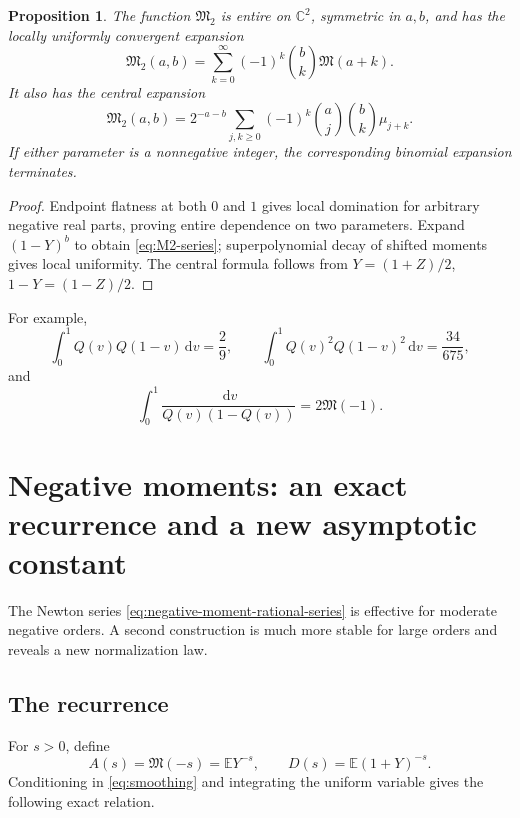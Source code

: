 \documentclass[11pt,oneside]{article}
\newtheorem{proposition}[theorem]{Proposition}
\theoremstyle{definition}
\newcommand{\Q}{Q}
\newcommand{\M}{\mathfrak M}
\newcommand{\E}{\mathbb E}
\newcommand{\C}{\mathbb C}
\newcommand{\dd}{\,\mathrm d}
\begin{document}
\begin{proposition}\label{prop:M2}
The function \(\M_2\) is entire on \(\C^2\), symmetric in \(a,b\), and has the
locally uniformly convergent expansion
\begin{equation}\label{eq:M2-series}
 \M_2(a,b)=\sum_{k=0}^{\infty}(-1)^k\binom bk\M(a+k).
\end{equation}
It also has the central expansion
\begin{equation}\label{eq:M2-central}
 \M_2(a,b)=2^{-a-b}
 \sum_{j,k\ge0}(-1)^k\binom aj\binom bk\mu_{j+k}.
\end{equation}
If either parameter is a nonnegative integer, the corresponding binomial expansion
terminates.
\end{proposition}

\begin{proof}
Endpoint flatness at both \(0\) and \(1\) gives local domination for arbitrary negative
real parts, proving entire dependence on two parameters.  Expand \((1-Y)^b\) to obtain
\cref{eq:M2-series}; superpolynomial decay of shifted moments gives local uniformity.
The central formula follows from \(Y=(1+Z)/2\), \(1-Y=(1-Z)/2\).
\end{proof}

For example,
\begin{equation}\label{eq:M2-examples}
 \int_0^1\Q(v)\Q(1-v)\dd v=\frac29,
 \qquad
 \int_0^1\Q(v)^2\Q(1-v)^2\dd v=\frac{34}{675},
\end{equation}
and
\begin{equation}\label{eq:M2-negative-example}
 \int_0^1\frac{\dd v}{\Q(v)(1-\Q(v))}=2\M(-1).
\end{equation}

\section{Negative moments: an exact recurrence and a new asymptotic constant}

The Newton series \cref{eq:negative-moment-rational-series} is effective for moderate
negative orders.  A second construction is much more stable for large orders and reveals
a new normalization law.

\subsection{The recurrence}

For \(s>0\), define
\begin{equation}\label{eq:A-D-def}
 A(s)=\M(-s)=\E Y^{-s},
 \qquad
 D(s)=\E(1+Y)^{-s}.
\end{equation}
Conditioning in \cref{eq:smoothing} and integrating the uniform variable gives the
following exact relation.
\end{document}
